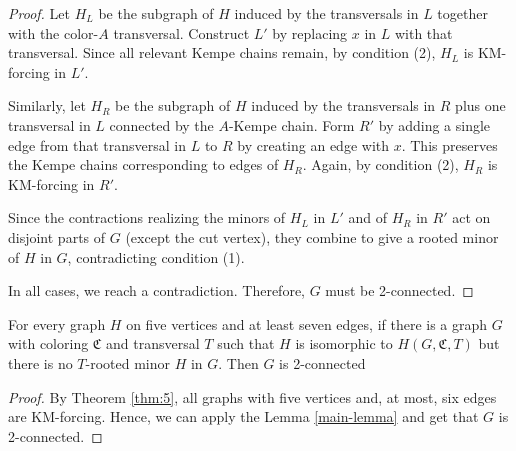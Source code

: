 \begin{proof}
 Let $H_L$ be the subgraph of $H$ induced by the transversals in $L$ together with the color-$A$ transversal.
 Construct $L'$ by replacing $x$ in $L$ with that transversal. Since all relevant Kempe chains remain,
 by condition (2), $H_L$ is KM-forcing in $L'$.
   
 Similarly, let $H_R$ be the subgraph of $H$ induced by the transversals in $R$ plus
 one transversal in $L$ connected by the $A$-Kempe chain. 
 Form $R'$ by adding a single edge from that transversal in $L$ to $R$ by creating an
 edge with $x$. This preserves the Kempe chains corresponding to edges of $H_R$. 
 Again, by condition (2), $H_R$ is KM-forcing in $R'$.
   
 Since the contractions realizing the minors of $H_L$ in $L'$ and of $H_R$ in $R'$ act on disjoint parts of $G$ (except the cut vertex), 
 they combine to give a rooted minor of $H$ in $G$, contradicting condition (1).
   
 In all cases, we reach a contradiction. Therefore, $G$ must be 2-connected.
   \end{proof}

   \begin{cor}
 For every graph $H$ on five vertices and at least seven edges, if there is a graph $G$ with coloring $\mathfrak{C}$
 and transversal $T$ such that $H$ is isomorphic to $H(G, \mathfrak{C}, T)$ but there is no $T$-rooted minor $H$ in $G$. Then
      $G$ is 2-connected
   \end{cor}
 
   \begin{proof}
 By Theorem \ref{thm:5}, all graphs with five vertices and, at most, six edges are KM-forcing.
 Hence, we can apply the Lemma \ref{main-lemma} and get that $G$ is 2-connected.
   \end{proof}
